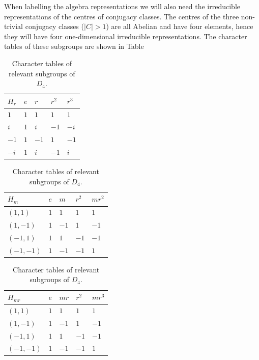 \documentclass[two column]{article}
\begin{document}
When labelling the algebra representations we will also need the irreducible representations of the centres of conjugacy classes. The centres of the three non-trivial conjugacy classes ($|C|>1$) are all Abelian and have four elements, hence they will have four one-dimensional irreducible representations. The character tables of these subgroups are shown in Table
\begin{table}[h]
\centering
\begin{tabular}{|l|llll|}\hline
  $H_r$ & $e$ & $r$ & $r^2$ & $r^3$ \\ \hline
$1$ & $1$   & $1$            & $1$             & $1$                                  \\ 
$i$ & $1$   & $i$            & $-1$             & $-i$                                  \\ 
$-1$ & $1$   & $-1$            & $1$             & $-1$                                  \\ 
$-i$ & $1$   & $i$            & $-1$             & $i$                                  \\ \hline
\end{tabular}
\begin{tabular}{|l|llll|}\hline
  $H_m$ & $e$ & $m$ & $r^2$ & $mr^2$ \\ \hline
$(1,1)$ & $1$   & $1$            & $1$             & $1$                                  \\ 
$(1,-1)$ & $1$   & $-1$            & $1$             & $-1$                                  \\ 
$(-1,1)$ & $1$   & $1$            & $-1$             & $-1$                                  \\ 
$(-1,-1)$ & $1$   & $-1$            & $-1$             & $1$                                  \\ \hline
\end{tabular}
\begin{tabular}{|l|llll|}\hline
  $H_{mr}$ & $e$ & $mr$ & $r^2$ & $mr^3$ \\ \hline
$(1,1)$ & $1$   & $1$            & $1$             & $1$                                  \\ 
$(1,-1)$ & $1$   & $-1$            & $1$             & $-1$                                  \\ 
$(-1,1)$ & $1$   & $1$            & $-1$             & $-1$                                  \\ 
$(-1,-1)$ & $1$   & $-1$            & $-1$             & $1$                                  \\ \hline
\end{tabular}
\caption{Character tables of relevant subgroups of $D_4$.}
\label{tab:red_ch}
\end{table}
\end{document}
